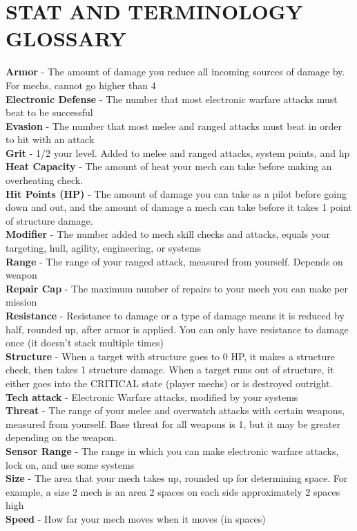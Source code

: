 \section{STAT AND TERMINOLOGY GLOSSARY}

\textbf{Armor} - The amount of damage you reduce all incoming sources of damage by. For mechs, cannot go higher than 4\\
\textbf{Electronic Defense} - The number that most electronic warfare attacks must beat to be successful\\
\textbf{Evasion} - The number that most melee and ranged attacks must beat in order to hit with an attack\\
\textbf{Grit} - 1/2 your level. Added to melee and ranged attacks, system points, and hp\\
\textbf{Heat Capacity} - The amount of heat your mech can take before making an overheating check.\\
\textbf{Hit Points (HP)} - The amount of damage you can take as a pilot before going down and out, and the amount of damage a mech can take before it takes 1 point of structure damage.\\
\textbf{Modifier} - The number added to mech skill checks and attacks, equals your targeting, hull, agility, engineering, or systems\\
\textbf{Range} - The range of your ranged attack, measured from yourself. Depends on weapon\\
\textbf{Repair Cap} - The maximum number of repairs to your mech you can make per mission\\
\textbf{Resistance} - Resistance to damage or a type of damage means it is reduced by half, rounded up, after armor is applied. You can only have resistance to damage once (it doesn’t stack multiple times)\\
\textbf{Structure} - When a target with structure goes to 0 HP, it makes a structure check, then takes 1 structure damage. When a target runs out of structure, it either goes into the CRITICAL state (player mechs) or is destroyed outright.\\
\textbf{Tech attack} - Electronic Warfare attacks, modified by your systems\\
\textbf{Threat} - The range of your melee and overwatch attacks with certain weapons, measured from yourself. Base threat for all weapons is 1, but it may be greater depending on the weapon.\\
\textbf{Sensor Range} - The range in which you can make electronic warfare attacks, lock on, and use some systems\\
\textbf{Size} - The area that your mech takes up, rounded up for determining space. For example, a size 2 mech is an area 2 spaces on each side approximately 2 spaces high\\
\textbf{Speed} - How far your mech moves when it moves (in spaces)